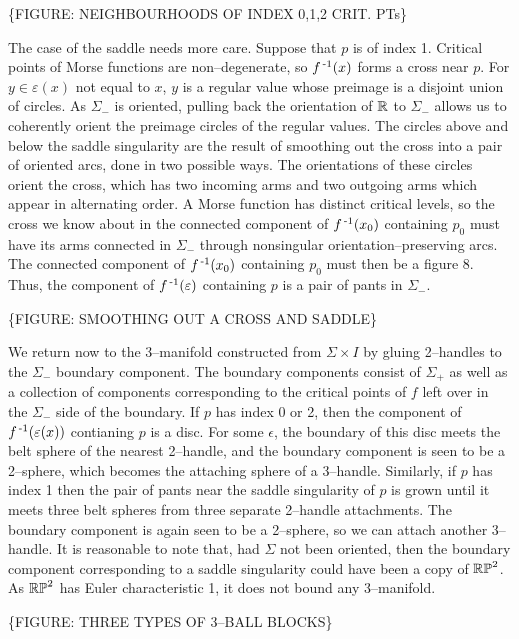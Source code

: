 \{FIGURE: NEIGHBOURHOODS OF INDEX 0,1,2 CRIT. PTs\}

The case of the saddle needs more care.
Suppose that $p$ is of index 1.
Critical points of Morse functions are non--degenerate, so $f^{\,\text{-}1} (x)$ forms a cross near $p$.
For $y\in\varepsilon(x)$ not equal to $x$, $y$ is a regular value whose preimage is a disjoint union of circles.
As $\Sigma_-$ is oriented, pulling back the orientation of $\mathbb{R}$ to $\Sigma_-$ allows us to coherently orient the preimage circles of the regular values.
The circles above and below the saddle singularity are the result of smoothing out the cross into a pair of oriented arcs, done in two possible ways.
The orientations of these circles orient the cross, which has two incoming arms and two outgoing arms which appear in alternating order.
A Morse function has distinct critical levels, so the cross we know about in the connected component of $f^{\,\text{-}1}(x_0)$ containing $p_0$ must have its arms connected in $\Sigma_-$ through nonsingular orientation--preserving arcs.
The connected component of $f^{\,\text{-}1}(x_0)$ containing $p_0$ must then be a figure 8.
Thus, the component of $f^{\,\text{-}1}(\varepsilon)$ containing $p$ is a pair of pants in $\Sigma_-$.

\{FIGURE: SMOOTHING OUT A CROSS AND SADDLE\}


We return now to the 3--manifold constructed from $\Sigma\times I$ by gluing 2--handles to the $\Sigma_-$ boundary component.
The boundary components consist of $\Sigma_+$ as well as a collection of components corresponding to the critical points of $f$ left over in the $\Sigma_-$ side of the boundary.
If $p$ has index 0 or 2, then the component of $f^{\,\text{-}1}(\varepsilon(x))$ contianing $p$ is a disc.
For some $\epsilon$, the boundary of this disc meets the belt sphere of the nearest 2--handle, and the boundary component is seen to be a 2--sphere, which becomes the attaching sphere of a 3--handle.
Similarly, if $p$ has index 1 then the pair of pants near the saddle singularity of $p$ is grown until it meets three belt spheres from three separate 2--handle attachments.
The boundary component is again seen to be a 2--sphere, so we can attach another 3--handle.
It is reasonable to note that, had $\Sigma$ not been oriented, then the boundary component corresponding to a saddle singularity could have been a copy of $\mathbb{RP}^2$.
As $\mathbb{RP}^2$ has Euler characteristic 1, it does not bound any 3--manifold.

\{FIGURE: THREE TYPES OF 3--BALL BLOCKS\}
